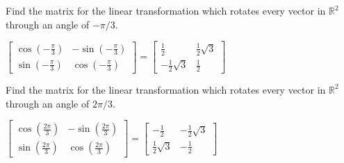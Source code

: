 \documentclass{ximera}
\begin{document}
\begin{problem}\label{prb:6.13} Find the matrix for the linear transformation which rotates every
vector in $\mathbb{R}^{2}$ through an angle of $-\pi /3.$
\begin{hint}
$\left[
\begin{array}{cc}
\cos \left( -\frac{\pi }{3}\right) & -\sin \left( -\frac{\pi }{3}\right) \\
\sin \left( -\frac{\pi }{3}\right) & \cos \left( -\frac{\pi }{3}\right)
\end{array}
\right] = \left[
\begin{array}{cc}
\frac{1}{2} & \frac{1}{2}\sqrt{3} \\
-\frac{1}{2}\sqrt{3} & \frac{1}{2}
\end{array}
\right] $
\end{hint}
\end{problem}

\begin{problem}\label{prb:6.14} Find the matrix for the linear transformation which rotates every
vector in $\mathbb{R}^{2}$ through an angle of $2\pi /3.$
\begin{hint}
$\left[
\begin{array}{cc}
\cos \left( \frac{2\pi }{3}\right) & -\sin \left( \frac{2\pi }{3}\right) \\
\sin \left( \frac{2\pi }{3}\right) & \cos \left( \frac{2\pi }{3}\right)
\end{array}
\right] = \left[
\begin{array}{cc}
-\frac{1}{2} & -\frac{1}{2}\sqrt{3} \\
\frac{1}{2}\sqrt{3} & -\frac{1}{2}
\end{array}
\right] $
\end{hint}
\end{problem}
\end{document}
